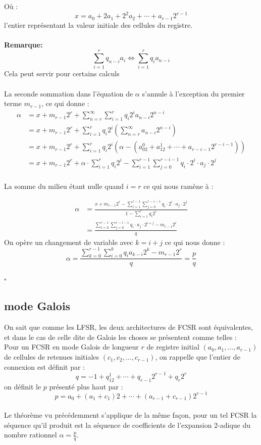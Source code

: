 \documentclass[11pt]{report}
\begin{document}
Où :
$$ x = a_0 + 2a_1 + 2^2a_2 + \cdots + a_{r-1}2^{r-1} $$
l'entier représentant la valeur initiale des cellules du registre.
\\
\\
\textbf{Remarque:}
$$
\sum_{i=1}^r q_{n-i}a_i \Leftrightarrow \sum_{i=1}^r q_ia_{n-i}
$$
Cela peut servir pour certains calculs 
\\
\\
La seconde sommation dans l'équation de $\alpha$ s'annule à l'exception du premier terme $m_{r-1}$, ce qui donne : 
\begin{align*}
\alpha &= x + m_{r-1}2^r + \sum_{n=r}^\infty\sum_{i=1}^r q_i2^ia_{n-i}2^{n-i}\\
&= x + m_{r-1}2^r + \sum_{i=1}^r q_i2^i(\sum_{n=r}^\infty a_{n-i}2^{n-i})\\
&= x + m_{r-1}2^r + \sum_{i=1}^r q_i2^i(\alpha - (a_02^0+a_12^1 + \cdots + a_{r-i-1}2^{r-i-1}))\\
&= x + m_{r-1}2^r + \alpha \cdot \sum_{i=1}^r q_i2^i - \sum_{i=1}^{r-1}\sum_{j=0}^{r-i-1} q_i \cdot 2^i \cdot a_j \cdot 2^j\\
\end{align*}

La somme du milieu étant nulle quand $i=r$ ce qui nous ramène à :

\begin{align*}
\alpha &= \frac{x + m_{r-1}2^r - \sum_{i=1}^{r-1}\sum_{j=0}^{r-i-1} q_i \cdot 2^i \cdot a_j \cdot 2^j }{1 - \sum_{i=1}^r q_i2^i}\\
&= \frac{\sum_{i=0}^{r-1}\sum_{j=0}^{r-i-1} q_i \cdot a_j \cdot 2^{i+j} - m_{r-1}2^r}{q}
\end{align*}
On opère un changement de variable avec $k = i+j$
ce qui nous donne :
$$
\alpha = \frac{\sum_{k=0}^{r-1}\sum_{i=0}^k q_ia_{k-i}2^k - m_{r-1}2^r}{q} = \frac{p}{q} 
$$
\begin{flushright}
$\square$
\end{flushright}

\subsection{mode Galois}
On sait que comme les LFSR, les deux architectures de FCSR sont équivalentes, et dans le cas de celle dite de Galois les choses se présentent comme telles : 
\\
Pour un FCSR en mode Galois de longueur $r$ de registre initial $(a_0,a_1, ... , a_{r-1})$ de cellules de retenues initiales $(c_1,c_2, ...,c_{r-1})$, on rappelle que l'entier de connexion est définit par :
$$
q = -1 + q_12^1 + \cdots + q_{r-1}2^{r-1} + q_r2^r
$$
 on définit le $p$ présenté plus haut par : 
$$
p= a_0 + (a_1 + c_1)2 + \cdots + (a_{r-1} + c_{r-1})2^{r-1}
$$
\\
Le théorème vu précédemment s'applique de la même façon, pour un tel FCSR la séquence qu'il produit est la séquence de coefficients de l'expansion 2-adique du nombre rationnel $\alpha = \frac{p}{q}$.
\end{document}
